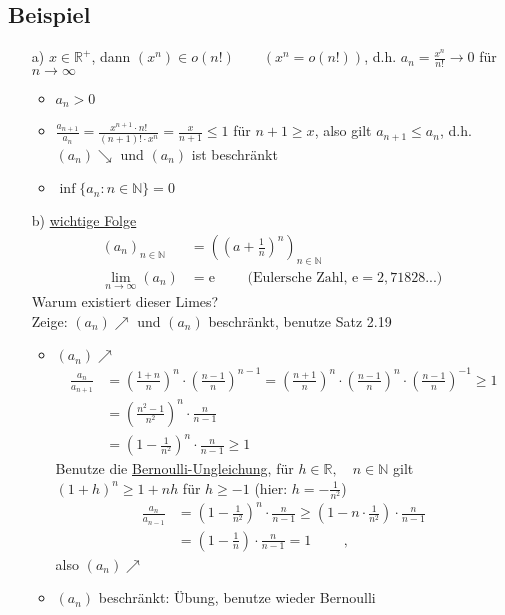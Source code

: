 \documentclass[12pt, titlepage]{article}
\newcommand{\R}{\mathds{R}}
\newcommand{\N}{\mathds{N}}
\newcommand{\e}{\textrm{e}}
\newcommand{\infn}{n\rightarrow\infty}
\renewcommand{\>}{\rightarrow}
\renewcommand{\*}{\cdot}
\begin{document}
	\subsection{Beispiel}
	\begin{itemize}
		\item[a)] $x\in\R^+$, dann $(x^n)\in o(n!)\qquad(x^n=o(n!))$, d.h. $a_n=\frac{x^n}{n!}\> 0$ für $\infn$
		\begin{itemize}
			\item $a_n>0$
			\item $\frac{a_{n+1}}{a_n}=\frac{x^{n+1}\*n!}{(n+1)!\*x^n}=\frac{x}{n+1}\leq 1$ für $n+1\geq x$, also gilt $a_{n+1}\leq a_n$, d.h. $(a_n)\searrow$ und $(a_n)$ ist beschränkt
			\item $\inf\{a_n\colon n\in\N\}=0$
		\end{itemize}
		\item[b)] \underline{wichtige Folge}\\
		\begin{align*}
			(a_n)_{n\in\N}&=((a+\frac{1}{n})^n)_{n\in\N}\\
			\lim\limits_{\infn}(a_n)&=\e\qquad\textrm{ (Eulersche Zahl, $\e=2,71828...$)}
		\end{align*}
		Warum existiert dieser Limes?\\
		Zeige: $(a_n)\nearrow$ und $(a_n)$ beschränkt, benutze Satz 2.19
		\begin{itemize}
			\item $(a_n)\nearrow$
			\begin{align*}
				\frac{a_n}{a_{n+1}}&=(\frac{1+n}{n})^n\*(\frac{n-1}{n})^{n-1}=(\frac{n+1}{n})^n\*(\frac{n-1}{n})^n\*(\frac{n-1}{n})^{-1}\geq 1\\
				&=(\frac{n^2-1}{n^2})^n\*\frac{n}{n-1}\\
				&=(1-\frac{1}{n^2})^n\*\frac{n}{n-1}\geq 1
			\end{align*}
			Benutze die \underline{Bernoulli-Ungleichung}, für $h\in\R,\quad n\in\N$ gilt $(1+h)^n\geq 1+nh$ für $h\geq -1$ (hier: $h=-\frac{1}{n^2}$)
			\begin{align*}
				\frac{a_n}{a_{n-1}}&=(1-\frac{1}{n^2})^n\*\frac{n}{n-1}\geq (1-n\*\frac{1}{n^2})\*\frac{n}{n-1}\\
				&=(1-\frac{1}{n})\*\frac{n}{n-1}=1\qquad\textrm{ , }
			\end{align*}
			also $(a_n)\nearrow$
			\item $(a_n)$ beschränkt: Übung, benutze wieder Bernoulli
		\end{itemize}
	\end{itemize}
\end{document}
